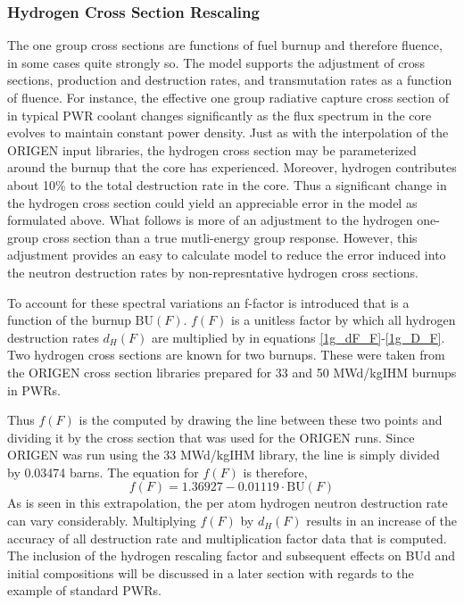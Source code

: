 \subsubsection{Hydrogen Cross Section Rescaling}
\label{1g_sec:H_rescale}
The one group cross sections are functions of fuel burnup and therefore fluence, in some cases quite 
strongly so.  The model supports the adjustment of  cross sections, production 
and destruction rates, and transmutation rates  as a function of fluence.  For instance, the effective 
one group radiative capture cross section of  in typical PWR coolant changes significantly 
as the flux spectrum in the core evolves to maintain constant power density.  Just as with the interpolation 
of the ORIGEN input libraries, the hydrogen cross section may be parameterized around the burnup that the core 
has experienced.  Moreover, hydrogen contributes about 10\% to the total destruction rate in the core.  
Thus a significant change in the hydrogen cross section could yield an appreciable error in the model as 
formulated above.  What follows is more of an adjustment to the hydrogen one-group cross section than a 
true mutli-energy group response.  However, this adjustment provides an easy to calculate model to 
reduce the error induced into the neutron destruction rates by non-represntative hydrogen cross sections.

To account for these spectral variations an f-factor is introduced that is a function of the burnup 
$\mbox{BU}(F)$.    $f(F)$ is a unitless factor by which all hydrogen destruction rates $d_H(F)$ are 
multiplied by in equations \ref{1g_dF_F}-\ref{1g_D_F}. Two hydrogen cross sections are known for two 
burnups.  These were taken from the ORIGEN cross section libraries prepared for 33 and 50 MWd/kgIHM 
burnups in PWRs.

Thus $f(F)$ is the computed by drawing the line between these two points and dividing it by the cross 
section that was used for the ORIGEN runs.  Since ORIGEN was run using the 33 MWd/kgIHM library, the 
line is simply divided by 0.03474 barns.  The equation for $f(F)$ is therefore, 
\begin{equation}
\label{1g_f_F}
f(F) = 1.36927 - 0.01119 \cdot \mbox{BU}(F)
\end{equation}
As is seen in this extrapolation, the per atom hydrogen neutron destruction rate can vary considerably.  
Multiplying $f(F)$ by $d_H(F)$ results in an increase of the accuracy of all destruction rate and 
multiplication factor data that is computed.  The inclusion of the hydrogen rescaling factor and 
subsequent effects on BUd and initial compositions will be discussed in a later section with regards 
to the example of standard PWRs.  



